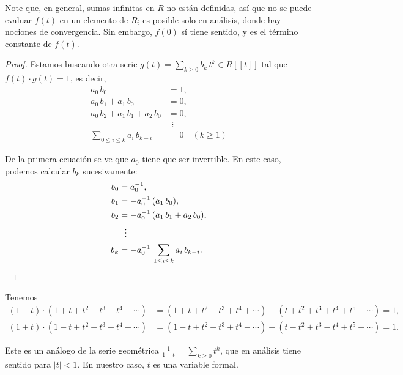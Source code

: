 \documentclass{article}
\numberwithin{equation}{section}
\theoremstyle{definition}
\begin{document}
\noindent Note que, en general, sumas infinitas en $R$ no están definidas,
así que no se puede evaluar $f (t)$ en un elemento de $R$; es posible solo
en análisis, donde hay nociones de convergencia. Sin embargo, $f (0)$ sí tiene
sentido, y es el término constante de $f (t)$.

\begin{proof}
  Estamos buscando otra serie $g (t) = \sum_{k \ge 0} b_k\,t^k \in R [\![t]\!]$
  tal que $f (t) \cdot g (t) = 1$, es decir,
  \begin{align*}
    a_0\,b_0 & = 1,\\
    a_0\,b_1 + a_1\,b_0 & = 0,\\
    a_0\,b_2 + a_1\,b_1 + a_2\,b_0 & = 0,\\
             & ~~\vdots \\
    \sum_{0 \le i \le k} a_i\,b_{k-i} & = 0 \quad (k \ge 1)
  \end{align*}

  De la primera ecuación se ve que $a_0$ tiene que ser invertible. En este caso,
  podemos calcular $b_k$ sucesivamente:
  \begin{align*}
    b_0 & = a_0^{-1},\\
    b_1 & = -a_0^{-1}\,(a_1\,b_0),\\
    b_2 & = -a_0^{-1}\,(a_1\,b_1 + a_2\,b_0),\\
        & ~~\vdots \\
    b_k & = -a_0^{-1}\,\sum_{1 \le i \le k} a_i\,b_{k-i}. \qedhere
  \end{align*}
\end{proof}

\begin{ejemplo}
  Tenemos
  \begin{align*}
    (1-t)\cdot (1 + t + t^2 + t^3 + t^4 + \cdots) & =
                                                    (1 + t + t^2 + t^3 + t^4 + \cdots) -
                                                    (t + t^2 + t^3 + t^4 + t^5 + \cdots) = 1,\\
    (1+t)\cdot (1 - t + t^2 - t^3 + t^4 - \cdots) & =
                                                    (1 - t + t^2 - t^3 + t^4 - \cdots) +
                                                    (t - t^2 + t^3 - t^4 + t^5 - \cdots) = 1.
  \end{align*}

  Este es un análogo de la serie geométrica
  $\frac{1}{1-t} = \sum_{k \ge 0} t^k$, que en análisis tiene sentido para
  $|t| < 1$. En nuestro caso, $t$ es una variable formal.
\end{ejemplo}
\end{document}
